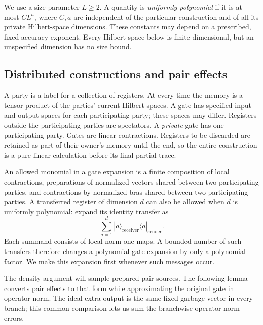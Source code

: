 \documentclass[11pt]{article}
\numberwithin{equation}{section}
\theoremstyle{definition}
\theoremstyle{remark}
\begin{document}
We use a size parameter $L\ge2$.  A quantity is \emph{uniformly polynomial}
if it is at most $C L^a$, where $C,a$ are independent of the particular
construction and of all its private Hilbert-space dimensions.  These
constants may depend on a prescribed, fixed accuracy exponent.  Every
Hilbert space below is finite dimensional, but an unspecified dimension
has no size bound.

\subsection{Distributed constructions and pair effects}

A party is a label for a collection of registers.  At every time the
memory is a tensor product of the parties' current Hilbert spaces.  A
gate has specified input and output spaces for each participating party;
these spaces may differ.  Registers outside the participating parties
are spectators.  A \emph{private} gate has one participating party.
Gates are linear contractions.  Registers to be discarded are retained
as part of their owner's memory until the end, so the entire construction
is a pure linear calculation before its final partial trace.

An allowed monomial in a gate expansion is a finite composition of local
contractions, preparations of normalized vectors shared between two
participating parties, and contractions by normalized bras shared
between two participating parties.  A transferred register of dimension
$d$ can also be allowed when $d$ is uniformly polynomial: expand its
identity transfer as
\[
 \sum_{a=1}^{d}|a\rangle_{\mathrm{receiver}}
                 \langle a|_{\mathrm{sender}}.
\]
Each summand consists of local norm-one maps.  A bounded number of such
transfers therefore changes a polynomial gate expansion by only a
polynomial factor.  We make this expansion first whenever such messages
occur.

The density argument will sample prepared pair sources.  The following
lemma converts pair effects to that form while approximating the original
gate in operator norm.  The ideal extra output is the same fixed garbage
vector in every branch; this common comparison lets us sum the branchwise
operator-norm errors.
\end{document}
